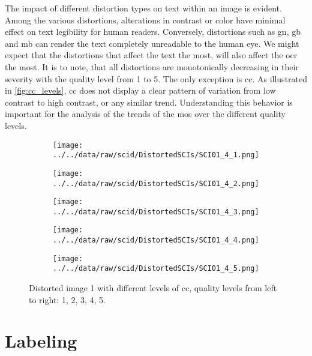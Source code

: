 The impact of different distortion types on text within an image is evident.
Among the various distortions, alterations in contrast or color have minimal effect on text legibility for human readers.
Conversely, distortions such as \gls{gn}, \gls{gb} and \gls{mb} can render the text completely unreadable to the human eye.
We might expect that the distortions that affect the text the most, will also affect the \gls{ocr} the most.
It is to note, that all distortions are monotonically decreasing in their severity with the quality level from 1 to 5.
The only exception is \gls{cc}.
As illustrated in \autoref{fig:cc_levels}, \gls{cc} does not display a clear pattern of variation from low contrast to high contrast, or any similar trend.
Understanding this behavior is important for the analysis of the trends of the \gls{mos} over the different quality levels.

\begin{figure}[h!]
    \centering
    \begin{subfigure}[b]{0.18\textwidth}
        \texttt{[image: ../../data/raw/scid/DistortedSCIs/SCI01\_4\_1.png]}
    \end{subfigure}
    \hfill
    \begin{subfigure}[b]{0.18\textwidth}
        \texttt{[image: ../../data/raw/scid/DistortedSCIs/SCI01\_4\_2.png]}
    \end{subfigure}
    \hfill
    \begin{subfigure}[b]{0.18\textwidth}
        \texttt{[image: ../../data/raw/scid/DistortedSCIs/SCI01\_4\_3.png]}
    \end{subfigure}
    \hfill
    \begin{subfigure}[b]{0.18\textwidth}
        \texttt{[image: ../../data/raw/scid/DistortedSCIs/SCI01\_4\_4.png]}
    \end{subfigure}
    \hfill
    \begin{subfigure}[b]{0.18\textwidth}
        \texttt{[image: ../../data/raw/scid/DistortedSCIs/SCI01\_4\_5.png]}
    \end{subfigure}
    \caption{Distorted image 1 with different levels of \gls{cc}, quality levels from left to right: 1, 2, 3, 4, 5.}
    \label{fig:cc_levels}
\end{figure}

\section{Labeling}
\label{sec:dataset_labeling}

